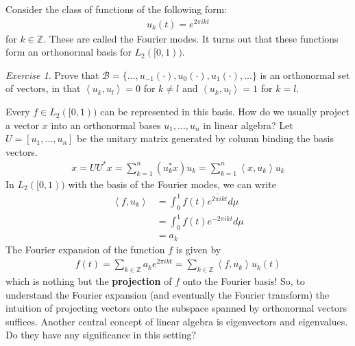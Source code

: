 \documentclass[11pt]{article}
\newcommand{\Z}{\ensuremath{\mathbb Z}}
\newcommand{\B}{\ensuremath{\mathcal B}}
\newcommand{\ip}[2]{\left\langle #1, #2\right\rangle}
\theoremstyle{plain}
\theoremstyle{definition}
\theoremstyle{remark}
\newtheorem{exc}{Exercise}[section]
\begin{document}
Consider the class of functions of the following form:
\begin{align*}
    u_k(t) = e^{2\pi i k t}
\end{align*}
for $k \in \Z$. These are called the Fourier modes. It turns out that these functions form an orthonormal basis for $L_2([0,1))$.
\begin{exc}
    Prove that $\B = \{..., u_{-1}(\cdot), u_0(\cdot), u_1(\cdot), ...\}$ is an orthonormal set of vectors, in that $\ip{u_k}{u_l} = 0$ for $k \neq l$ and $\ip{u_k}{u_l} = 1$ for $k = l$.
\end{exc}
Every $f \in  L_2([0, 1))$ can be represented in this basis. How do we usually project a vector $x$ into an orthonormal bases $u_1, ..., u_n$ in linear algebra? Let $U = [u_1, ..., u_n]$ be the unitary matrix generated by column binding the basis vectors.
\begin{align*}
    x = UU^*x = \sum_{k=1}^n (u_k^*x) u_k = \sum_{k=1}^n \ip{x}{u_k} u_k
\end{align*}
In $L_2([0,1))$ with the basis of the Fourier modes, we can write
\begin{align*}
    \ip{f}{u_k} &= \int_0^1 f(t) \overline{e^{2\pi i k t}} d\mu\\
    &= \int_0^1 f(t) e^{-2\pi i k t} d\mu\\
    &= a_k
\end{align*}
The Fourier expansion of the function $f$ is given by
\begin{align*}
    f(t) = \sum_{k \in \Z} a_k e^{2\pi i k t} = \sum_{k \in \Z} \ip{f}{u_k} u_k(t)
\end{align*}
which is nothing but the {\bf projection} of $f$ onto the Fourier basis! So, to understand the Fourier expansion (and eventually the Fourier transform) the intuition of projecting vectors onto the subspace spanned by orthonormal vectors suffices. Another central concept of linear algebra is eigenvectors and eigenvalues. Do they have any significance in this setting?
\end{document}

